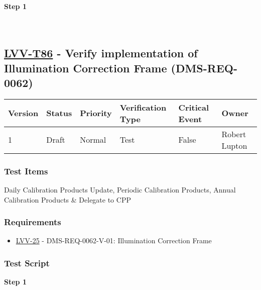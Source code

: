 \textbf{Step 1}\\
~\\
~\\

\hypertarget{lvv-t86---verify-implementation-of-illumination-correction-frame-dms-req-0062}{%
\subsection{\texorpdfstring{\href{https://jira.lsstcorp.org/secure/Tests.jspa\#/testCase/LVV-T86}{LVV-T86}
- Verify implementation of Illumination Correction Frame
(DMS-REQ-0062)}{LVV-T86 - Verify implementation of Illumination Correction Frame (DMS-REQ-0062)}}\label{lvv-t86---verify-implementation-of-illumination-correction-frame-dms-req-0062}}

\begin{longtable}[]{@{}llllll@{}}
\toprule
Version & Status & Priority & Verification Type & Critical Event &
Owner\tabularnewline
\midrule
\endhead
1 & Draft & Normal & Test & False & Robert Lupton\tabularnewline
\bottomrule
\end{longtable}

\hypertarget{test-items-175}{%
\subsubsection{Test Items}\label{test-items-175}}

Daily Calibration Products Update, Periodic Calibration Products, Annual
Calibration Products \& Delegate to CPP

\hypertarget{requirements-176}{%
\subsubsection{Requirements}\label{requirements-176}}

\begin{itemize}
\tightlist
\item
  \href{https://jira.lsstcorp.org/browse/LVV-25}{LVV-25} -
  DMS-REQ-0062-V-01: Illumination Correction Frame
\end{itemize}

\hypertarget{test-script-176}{%
\subsubsection{Test Script}\label{test-script-176}}

\textbf{Step 1}\\
~\\
~\\


